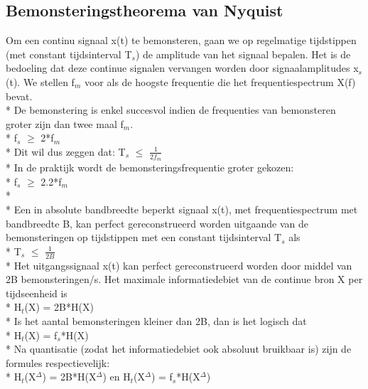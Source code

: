 \documentclass[10pt]{article}
\begin{document}
\subsection{Bemonsteringstheorema van Nyquist}
Om een continu signaal x(t) te bemonsteren, gaan we op regelmatige tijdstippen (met constant tijdsinterval T$_s$) de amplitude van het signaal bepalen. Het is de bedoeling dat deze continue signalen vervangen worden door signaalamplitudes x$_s$(t). We stellen f$_m$ voor als de hoogste frequentie die het frequentiespectrum X(f) bevat.\\*
De bemonstering is enkel succesvol indien de frequenties van bemonsteren groter zijn dan twee maal f$_m$.\\*
f$_s$ $\geq$ 2*f$_m$\\*
Dit wil dus zeggen dat: T$_s$ $\leq$ $\frac{1}{2f_m}$\\*
In de praktijk wordt de bemonsteringsfrequentie groter gekozen:\\*
f$_s$ $\geq$ 2.2*f$_m$\\*\\*
Een in absolute bandbreedte beperkt signaal x(t), met frequentiespectrum met bandbreedte B, kan perfect gereconstrueerd worden uitgaande van de bemonsteringen op tijdstippen met een constant tijdsinterval T$_s$ als\\*
T$_s$ $\leq$ $\frac{1}{2B}$\\*
Het uitgangssignaal x(t) kan perfect gereconstrueerd worden door middel van 2B bemonsteringen/s. Het maximale informatiedebiet van de continue bron X per tijdseenheid is\\*
H$_t$(X) = 2B*H(X)\\*
Is het aantal bemonsteringen kleiner dan 2B, dan is het logisch dat\\*
H$_t$(X) = f$_s$*H(X)\\*
Na quantisatie (zodat het informatiedebiet ook absoluut bruikbaar is) zijn de formules respectievelijk:\\*
H$_t$(X$^\Delta$) = 2B*H(X$^\Delta$) en H$_t$(X$^\Delta$) = f$_s$*H(X$^\Delta$)
\end{document}
